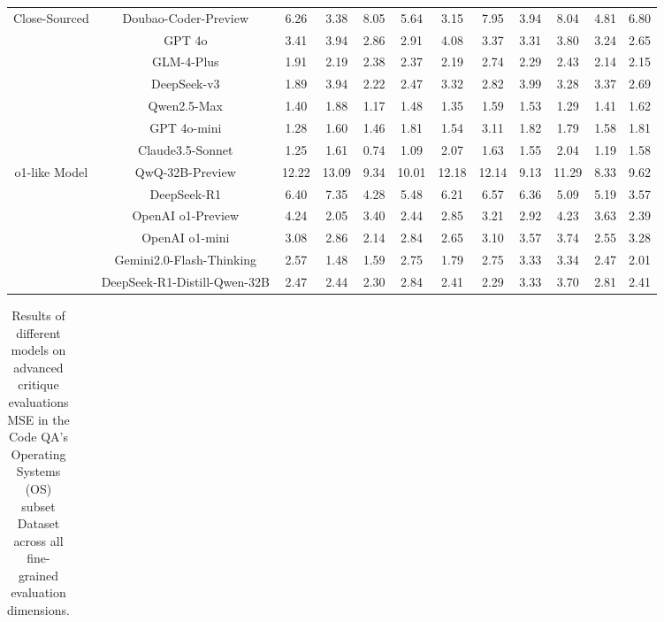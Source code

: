 \documentclass[11pt, a4paper, logo, copyright, nonumbering, amsart]{map}
\begin{document}
\begin{CJK*}{UTF8}{gbsn}
\begin{table*}[h!]
\begin{adjustbox}{width=\textwidth}
\begin{tabular}{c|c|cccccccccc}
    \midrule
    \multirow{7}{*}{Close-Sourced} 
    & Doubao-Coder-Preview & 6.26 & 3.38 & 8.05 & 5.64 & 3.15 & 7.95 & 3.94 & 8.04 & 4.81 & 6.80 \\
    & GPT 4o & 3.41 & 3.94 & 2.86 & 2.91 & 4.08 & 3.37 & 3.31 & 3.80 & 3.24 & 2.65 \\
    & GLM-4-Plus & 1.91 & 2.19 & 2.38 & 2.37 & 2.19 & 2.74 & 2.29 & 2.43 & 2.14 & 2.15 \\
    & DeepSeek-v3 & 1.89 & 3.94 & 2.22 & 2.47 & 3.32 & 2.82 & 3.99 & 3.28 & 3.37 & 2.69 \\
    & Qwen2.5-Max & 1.40 & 1.88 & 1.17 & 1.48 & 1.35 & 1.59 & 1.53 & 1.29 & 1.41 & 1.62 \\
    & GPT 4o-mini & 1.28 & 1.60 & 1.46 & 1.81 & 1.54 & 3.11 & 1.82 & 1.79 & 1.58 & 1.81 \\
    & Claude3.5-Sonnet & 1.25 & 1.61 & 0.74 & 1.09 & 2.07 & 1.63 & 1.55 & 2.04 & 1.19 & 1.58 \\
    
    \midrule
    \multirow{6}{*}{o1-like Model} 
    & QwQ-32B-Preview & 12.22 & 13.09 & 9.34 & 10.01 & 12.18 & 12.14 & 9.13 & 11.29 & 8.33 & 9.62 \\
    & DeepSeek-R1 & 6.40 & 7.35 & 4.28 & 5.48 & 6.21 & 6.57 & 6.36 & 5.09 & 5.19 & 3.57 \\
    & OpenAI o1-Preview & 4.24 & 2.05 & 3.40 & 2.44 & 2.85 & 3.21 & 2.92 & 4.23 & 3.63 & 2.39 \\
    & OpenAI o1-mini & 3.08 & 2.86 & 2.14 & 2.84 & 2.65 & 3.10 & 3.57 & 3.74 & 2.55 & 3.28 \\
    & Gemini2.0-Flash-Thinking & 2.57 & 1.48 & 1.59 & 2.75 & 1.79 & 2.75 & 3.33 & 3.34 & 2.47 & 2.01 \\
    & DeepSeek-R1-Distill-Qwen-32B & 2.47 & 2.44 & 2.30 & 2.84 & 2.41 & 2.29 & 3.33 & 3.70 & 2.81 & 2.41 \\
    \bottomrule
    \end{tabular}
    \end{adjustbox}
\end{table*}

\begin{table*}[h!]
    \centering
    \caption{Results of different models on advanced critique evaluations MSE in the Code QA's Operating Systems (OS) subset Dataset across all fine-grained evaluation dimensions.} \label{table:real_level2_os_dim}
    \begin{adjustbox}{width=\textwidth}
    \begin{tabular}{c|c|cccccccccc}
    

\end{tabular}
\end{adjustbox}
\end{table*}
\end{CJK*}
\end{document}
